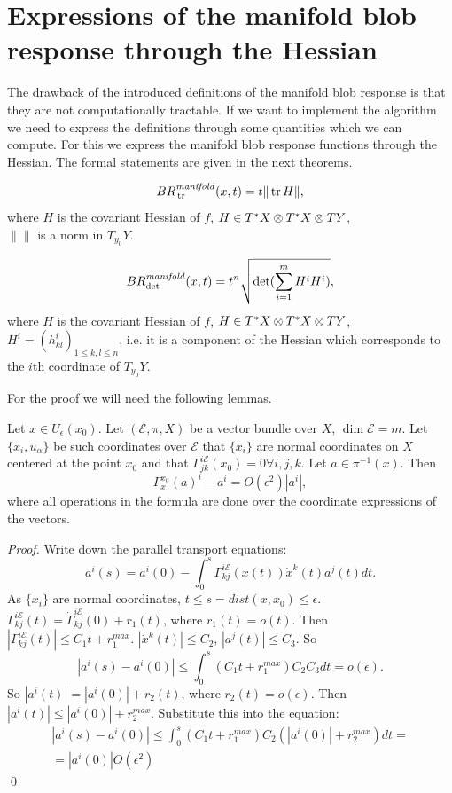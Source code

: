 \documentclass[twocolumn]{svjour3}          %
\newcommand{\manifold}{\mathop{\it manifold}}
\newcommand{\Ueps}{U_{\epsilon}}
\newcommand{\TangentBundle}[1]{T{#1}}
\newcommand{\CotangentBundle}[1]{\tensor*{T}{^{*}}{#1}}
\newcommand {\tr}{{\,}\mathrm{tr}{\,}}
\newcommand {\HessianSpace}[2]{\CotangentBundle{#1}\otimes \CotangentBundle{#1}\otimes \TangentBundle{#2}}
\newcommand {\bigeps}{\mathcal{E}}
\begin{document}
\section{Expressions of the manifold blob response through the Hessian}
The drawback of the introduced definitions of the manifold blob response is that they are not computationally tractable. If we want to implement the algorithm we need to express the definitions through some quantities which we can compute. For this we express the manifold blob response functions through the Hessian. The formal statements are given in the next theorems. 
\begin{theorem}\label{BR_trHess}
$$BR_{\tr}^{\manifold}(x,t)=t\|\tr H\|,$$
where $H$ is the covariant Hessian of $f$, $H \in \HessianSpace{X}{Y}$,
\\
$\|\|$ is a norm in $T_{y_0} Y$.
\end{theorem}

\begin{theorem}\label{BR_detHess}
$$BR_{\det}^{\manifold}(x,t)=t^n\sqrt{\det (\sum_{i=1}^{m} H^i H^i)},$$
where $H$ is the covariant Hessian of $f$, $H \in \HessianSpace{X}{Y}$,
\\
$H^i = (h_{kl}^i)_{1 \le k,l \le n}$, i.e. it is a component of the Hessian which corresponds to the $i$th coordinate of $T_{y_0} Y$.
\end{theorem}

For the proof we will need the following lemmas.

\begin{lemma}\label{ParallelTransport}
Let $x \in \Ueps(x_0)$. Let $(\bigeps, \pi, X)$ be a vector bundle over $X$, $\dim\bigeps=m$. Let $\{x_i, u_\alpha\}$ be such coordinates over $\bigeps$ that $\{x_i\}$ are normal coordinates on $X$ centered at the point $x_0$ and that $\Gamma^{i\bigeps}_{jk}(x_0) = 0 \forall i,j,k$. Let $a \in \pi^{-1}(x)$. Then
$$\Gamma_x^{x_0}(a)^i - a^i = O(\epsilon^2)|a^i|,$$
where all operations in the formula are done over the coordinate expressions of the vectors.
\end{lemma}

\begin{proof}
Write down the parallel transport equations:
$$a^i(s) = a^i(0) - \int_0^s \Gamma^{i\bigeps}_{kj}(x(t)) \dot{x}^k(t)a^j(t) dt.$$
As $\{x_i\}$ are normal coordinates, $t \le s = dist(x, x_0) \le \epsilon$. $\Gamma^{i\bigeps}_{kj}(t) = \dot{\Gamma}^{i\bigeps}_{kj}(0) + r_1(t)$, where $r_1(t)=o(t)$. Then $|\Gamma^{i\bigeps}_{kj}(t)| \le C_1 t + r_1^{max}$. $|\dot{x}^k(t)| \le C_2$, $|a^j(t)| \le C_3$. So
$$|a^i(s) - a^i(0)| \le \int_0^s (C_1 t + r_1^{max})C_2 C_3 dt = o(\epsilon).$$
So $|a^i(t)| = |a^i(0)| + r_2(t)$, where $r_2(t)=o(\epsilon)$. Then $|a^i(t)| \le |a^i(0)| + r_2^{max}$. Substitute this into the equation:
\begin{multline*}|a^i(s) - a^i(0)| \le \int_0^s (C_1 t + r_1^{max})C_2 (|a^i(0)| + r_2^{max}) dt = \\
= |a^i(0)| O(\epsilon ^2)\end{multline*} \qed
\end{proof}
\end{document}
